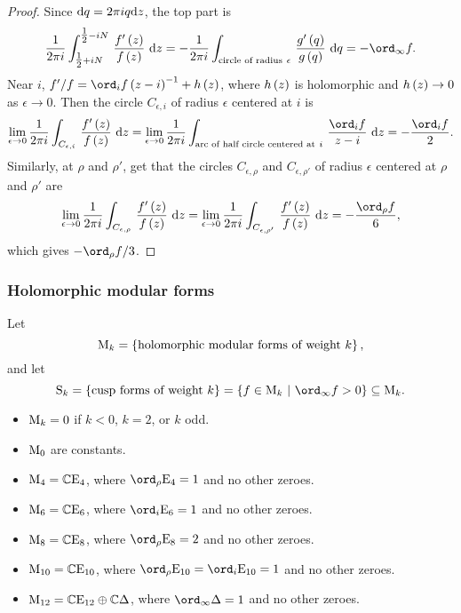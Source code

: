 \begin{proof}
Since $ \mathrm{d} q = 2\pi iq\mathrm{d} z $, the top part is
$$ \dfrac{1}{2\pi i}\intd{\tfrac{1}{2} + iN}{\tfrac{1}{2} - iN}{\dfrac{f'\br{z}}{f\br{z}}}{z} = -\dfrac{1}{2\pi i}\intd{\text{circle of radius} \ \epsilon}{}{\dfrac{g'\br{q}}{g\br{q}}}{q} = -\ord_\infty f. $$
Near $ i $, $ f' / f = \ord_i f\br{z - i}^{-1} + h\br{z} $, where $ h\br{z} $ is holomorphic and $ h\br{z} \to 0 $ as $ \epsilon \to 0 $. Then the circle $ C_{\epsilon, i} $ of radius $ \epsilon $ centered at $ i $ is
$$ \lim_{\epsilon \to 0} \dfrac{1}{2\pi i}\intd{C_{\epsilon, i}}{}{\dfrac{f'\br{z}}{f\br{z}}}{z} = \lim_{\epsilon \to 0} \dfrac{1}{2\pi i}\intd{\text{arc of half circle centered at} \ i}{}{\dfrac{\ord_i f}{z - i}}{z} = -\dfrac{\ord_i f}{2}. $$
Similarly, at $ \rho $ and $ \rho' $, get that the circles $ C_{\epsilon, \rho} $ and $ C_{\epsilon, \rho'} $ of radius $ \epsilon $ centered at $ \rho $ and $ \rho' $ are
$$ \lim_{\epsilon \to 0} \dfrac{1}{2\pi i}\intd{C_{\epsilon, \rho}}{}{\dfrac{f'\br{z}}{f\br{z}}}{z} = \lim_{\epsilon \to 0} \dfrac{1}{2\pi i}\intd{C_{\epsilon, \rho'}}{}{\dfrac{f'\br{z}}{f\br{z}}}{z} = -\dfrac{\ord_\rho f}{6}, $$
which gives $ -\ord_\rho f / 3 $.
\end{proof}

\pagebreak

\subsubsection{Holomorphic modular forms}

Let
$$ \M_k = \cbr{\text{holomorphic modular forms of weight} \ k}, $$
and let
$$ \S_k = \cbr{\text{cusp forms of weight} \ k} = \cbr{f \in \M_k \st \ord_\infty f > 0} \subseteq \M_k. $$

\begin{corollary}
\hfill
\begin{itemize}
\item $ \mathrm{M}_k = 0 $ if $ k < 0 $, $ k = 2 $, or $ k $ odd.
\item $ \mathrm{M}_0 $ are constants.
\item $ \mathrm{M}_4 = \mathbb{C}\mathrm{E}_4 $, where $ \ord_\rho \E_4 = 1 $ and no other zeroes.
\item $ \mathrm{M}_6 = \mathbb{C}\mathrm{E}_6 $, where $ \ord_i \E_6 = 1 $ and no other zeroes.
\item $ \mathrm{M}_8 = \mathbb{C}\mathrm{E}_8 $, where $ \ord_\rho \E_8 = 2 $ and no other zeroes.
\item $ \mathrm{M}_{10} = \mathbb{C}\mathrm{E}_{10} $, where $ \ord_\rho \E_{10} = \ord_i \E_{10} = 1 $ and no other zeroes.
\item $ \mathrm{M}_{12} = \mathbb{C}\mathrm{E}_{12} \oplus \mathbb{C}\Delta $, where $ \ord_\infty \Delta = 1 $ and no other zeroes.
\end{itemize}
\end{corollary}

